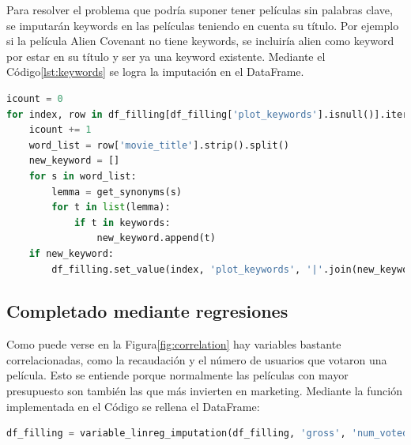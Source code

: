 Para resolver el problema que podría suponer tener películas sin palabras clave, se imputarán keywords en las películas teniendo en cuenta su título. Por ejemplo si la película Alien Covenant no tiene keywords, se incluiría alien como keyword por estar en su título y ser ya una keyword existente. Mediante el Código\ref{lst:keywords} se logra la imputación en el DataFrame.

\begin{lstlisting}[language=Python, caption=Imputación de keywords a partir del título de la película., label ={lst:keywords}]
icount = 0
for index, row in df_filling[df_filling['plot_keywords'].isnull()].iterrows():
    icount += 1
    word_list = row['movie_title'].strip().split()
    new_keyword = []
    for s in word_list:
        lemma = get_synonyms(s)
        for t in list(lemma):
            if t in keywords: 
                new_keyword.append(t)
    if new_keyword:
        df_filling.set_value(index, 'plot_keywords', '|'.join(new_keyword)) 
\end{lstlisting}

\subsection{Completado mediante regresiones}

Como puede verse en la Figura\ref{fig:correlation} hay variables bastante correlacionadas, como la recaudación y el número de usuarios que votaron una película. Esto se entiende porque normalmente las películas con mayor presupuesto son también las que más invierten en marketing. Mediante la función implementada en el Código se rellena el DataFrame:

\begin{lstlisting}[language=Python, caption = Rellenado de la variable de presupuesto teniendo en cuenta el número de votos.]
df_filling = variable_linreg_imputation(df_filling, 'gross', 'num_voted_users')
\end{lstlisting}

